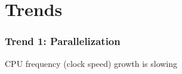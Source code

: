 \documentclass[
    xcolor={svgnames},
    hyperref={colorlinks, citecolor=DeepPink4, linkcolor=DarkRed, urlcolor=DarkBlue}
    ]{beamer}  %
\newcommand{\1}{\mathbbm 1}
\begin{document}
\section{Trends}

\begin{frame}
    \frametitle{Trend 1: Parallelization}

    CPU frequency (clock speed) growth is slowing

    \begin{figure}
       \begin{center}
       \end{center}
    \end{figure}

\end{frame}
\end{document}
